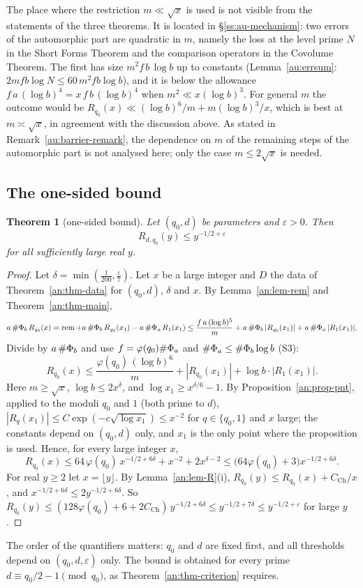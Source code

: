 \documentclass[10pt]{amsart}
\newtheorem{theorem}{Theorem}[section]
\theoremstyle{definition}
\theoremstyle{remark}
\begin{document}
The place where the restriction $m\ll\sqrt x$ is used is not visible from
the statements of the three theorems. It is located in
\S\ref{ss:au-mechanism}: two errors of the automorphic part are quadratic in
$m$, namely the loss at the level prime $N$ in the Short Forms Theorem and the
comparison operators in the Covolume Theorem. The first has size $m^{2}f\,b\,\log b$
up to constants (Lemma~\ref{au:errsum}: $2mfb\log N\le60\,m^{2}fb\log b$), and
it is below the allowance $f\,a\,(\log b)^{4}=x\,f\,b\,(\log b)^{4}$ when
$m^{2}\ll x(\log b)^{3}$.
For general $m$ the outcome would be
$R_{q_0}(x)\ll(\log b)^{6}/m+m(\log b)^{3}/x$, which is best at
$m\asymp\sqrt x$, in agreement with the discussion above. As stated in
Remark~\ref{au:barrier-remark}, the dependence on $m$ of the remaining steps
of the automorphic part is not analysed here; only the case $m\le2\sqrt x$ is needed.

\subsection{The one-sided bound}\label{an:ssec-onesided}
\begin{theorem}[one-sided bound]\label{an:thm-onesided}
Let $(q_0,d)$ be parameters and $\varepsilon>0$. Then
\[
 R_{d,q_0}(y)\le y^{-1/2+\varepsilon}
\]
for all sufficiently large real $y$.
\end{theorem}
\begin{proof}
Let $\delta=\min(\frac1{200},\frac\varepsilon7)$. Let $x$ be a large integer
and $D$ the data of Theorem~\ref{an:thm-data} for $(q_0,d)$, $\delta$
and $x$. By Lemma~\ref{an:lem-rem} and Theorem~\ref{an:thm-main},
\[
 a\,\#\Phi_b\,R_{q_0}(x)=\operatorname{rem}+a\,\#\Phi_b\,R_{q_0}(x_1)-a\,\#\Phi_a\,R_1(x_1)\le\frac{f\,a\,(\log b)^{5}}m+a\,\#\Phi_b\,|R_{q_0}(x_1)|+a\,\#\Phi_a\,|R_1(x_1)| .
\]
Divide by $a\,\#\Phi_b$ and use $f=\varphi(q_0)\#\Phi_a$ and
$\#\Phi_a\le\#\Phi_b\log b$ (S3):
\begin{equation}\label{an:eq-Rle}
 R_{q_0}(x)\le\frac{\varphi(q_0)\,(\log b)^{6}}{m}+|R_{q_0}(x_1)|+\log b\cdot|R_1(x_1)| .
\end{equation}
Here $m\ge\sqrt x$, $\log b\le2x^{\delta}$, and
$\log x_1\ge x^{\delta/6}-1$. By Proposition~\ref{an:prop-pnt}, applied to
the moduli $q_0$ and $1$ (both prime to $d$),
$|R_{q}(x_1)|\le C\exp(-c\sqrt{\log x_1})\le x^{-2}$ for $q\in\{q_0,1\}$ and
$x$ large; the constants depend on $(q_0,d)$ only, and $x_1$ is the only
point where the proposition is used. Hence, for every large integer $x$,
\[
 R_{q_0}(x)\le64\,\varphi(q_0)\,x^{-1/2+6\delta}+x^{-2}+2x^{\delta-2}\le\bigl(64\varphi(q_0)+3\bigr)x^{-1/2+6\delta}.
\]
For real $y\ge2$ let $x=\lfloor y\rfloor$. By
Lemma~\ref{an:lem-R}(i), $R_{q_0}(y)\le R_{q_0}(x)+C_{\mathrm{Ch}}/x$, and
$x^{-1/2+6\delta}\le2y^{-1/2+6\delta}$. So
$R_{q_0}(y)\le(128\varphi(q_0)+6+2C_{\mathrm{Ch}})\,y^{-1/2+6\delta}\le y^{-1/2+7\delta}\le y^{-1/2+\varepsilon}$
for large $y$.
\end{proof}
The order of the quantifiers matters: $q_0$ and $d$ are fixed first, and
all thresholds depend on $(q_0,d,\varepsilon)$ only. The bound is obtained
for every prime $d\equiv q_0/2-1\pmod{q_0}$, as
Theorem~\ref{an:thm-criterion} requires.
\end{document}
